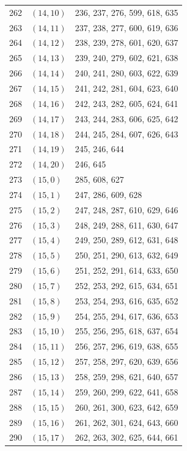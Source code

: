 \documentclass{article}
\begin{document}
\begin{longtable}{lll}
  262 & \((14, 10)\) & 236, 237, 276, 599, 618, 635 \\
  263 & \((14, 11)\) & 237, 238, 277, 600, 619, 636 \\
  264 & \((14, 12)\) & 238, 239, 278, 601, 620, 637 \\
  265 & \((14, 13)\) & 239, 240, 279, 602, 621, 638 \\
  266 & \((14, 14)\) & 240, 241, 280, 603, 622, 639 \\
  267 & \((14, 15)\) & 241, 242, 281, 604, 623, 640 \\
  268 & \((14, 16)\) & 242, 243, 282, 605, 624, 641 \\
  269 & \((14, 17)\) & 243, 244, 283, 606, 625, 642 \\
  270 & \((14, 18)\) & 244, 245, 284, 607, 626, 643 \\
  271 & \((14, 19)\) & 245, 246, 644 \\
  272 & \((14, 20)\) & 246, 645 \\
  273 & \((15, 0)\) & 285, 608, 627 \\
  274 & \((15, 1)\) & 247, 286, 609, 628 \\
  275 & \((15, 2)\) & 247, 248, 287, 610, 629, 646 \\
  276 & \((15, 3)\) & 248, 249, 288, 611, 630, 647 \\
  277 & \((15, 4)\) & 249, 250, 289, 612, 631, 648 \\
  278 & \((15, 5)\) & 250, 251, 290, 613, 632, 649 \\
  279 & \((15, 6)\) & 251, 252, 291, 614, 633, 650 \\
  280 & \((15, 7)\) & 252, 253, 292, 615, 634, 651 \\
  281 & \((15, 8)\) & 253, 254, 293, 616, 635, 652 \\
  282 & \((15, 9)\) & 254, 255, 294, 617, 636, 653 \\
  283 & \((15, 10)\) & 255, 256, 295, 618, 637, 654 \\
  284 & \((15, 11)\) & 256, 257, 296, 619, 638, 655 \\
  285 & \((15, 12)\) & 257, 258, 297, 620, 639, 656 \\
  286 & \((15, 13)\) & 258, 259, 298, 621, 640, 657 \\
  287 & \((15, 14)\) & 259, 260, 299, 622, 641, 658 \\
  288 & \((15, 15)\) & 260, 261, 300, 623, 642, 659 \\
  289 & \((15, 16)\) & 261, 262, 301, 624, 643, 660 \\
  290 & \((15, 17)\) & 262, 263, 302, 625, 644, 661 \\

\end{longtable}
\end{document}
